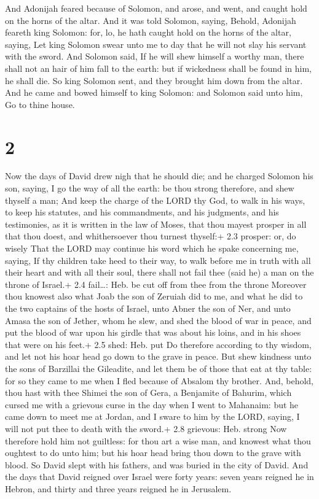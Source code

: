  And Adonijah feared because of Solomon, and arose, and
went, and caught hold on the horns of the altar.  And it
was told Solomon, saying, Behold, Adonijah feareth king Solomon: for,
lo, he hath caught hold on the horns of the altar, saying, Let king
Solomon swear unto me to day that he will not slay his servant with the
sword.  And Solomon said, If he will shew himself a worthy
man, there shall not an hair of him fall to the earth: but if wickedness
shall be found in him, he shall die.  So king Solomon sent,
and they brought him down from the altar. And he came and bowed himself
to king Solomon: and Solomon said unto him, Go to thine house.

\hypertarget{section-1}{%
\section{2}\label{section-1}}

 Now the days of David drew nigh that he should die; and he
charged Solomon his son, saying,  I go the way of all the
earth: be thou strong therefore, and shew thyself a man; 
And keep the charge of the LORD thy God, to walk in his ways, to keep
his statutes, and his commandments, and his judgments, and his
testimonies, as it is written in the law of Moses, that thou mayest
prosper in all that thou doest, and whithersoever thou turnest thyself:+
2.3 prosper: or, do wisely  That the LORD may continue his
word which he spake concerning me, saying, If thy children take heed to
their way, to walk before me in truth with all their heart and with all
their soul, there shall not fail thee (said he) a man on the throne of
Israel.+ 2.4 fail\ldots: Heb. be cut off from thee from the throne
 Moreover thou knowest also what Joab the son of Zeruiah did
to me, and what he did to the two captains of the hosts of Israel, unto
Abner the son of Ner, and unto Amasa the son of Jether, whom he slew,
and shed the blood of war in peace, and put the blood of war upon his
girdle that was about his loins, and in his shoes that were on his
feet.+ 2.5 shed: Heb. put  Do therefore according to thy
wisdom, and let not his hoar head go down to the grave in peace.
 But shew kindness unto the sons of Barzillai the Gileadite,
and let them be of those that eat at thy table: for so they came to me
when I fled because of Absalom thy brother.  And, behold,
thou hast with thee Shimei the son of Gera, a Benjamite of Bahurim,
which cursed me with a grievous curse in the day when I went to
Mahanaim: but he came down to meet me at Jordan, and I sware to him by
the LORD, saying, I will not put thee to death with the sword.+ 2.8
grievous: Heb. strong  Now therefore hold him not guiltless:
for thou art a wise man, and knowest what thou oughtest to do unto him;
but his hoar head bring thou down to the grave with blood. 
So David slept with his fathers, and was buried in the city of David.
 And the days that David reigned over Israel were forty
years: seven years reigned he in Hebron, and thirty and three years
reigned he in Jerusalem.

